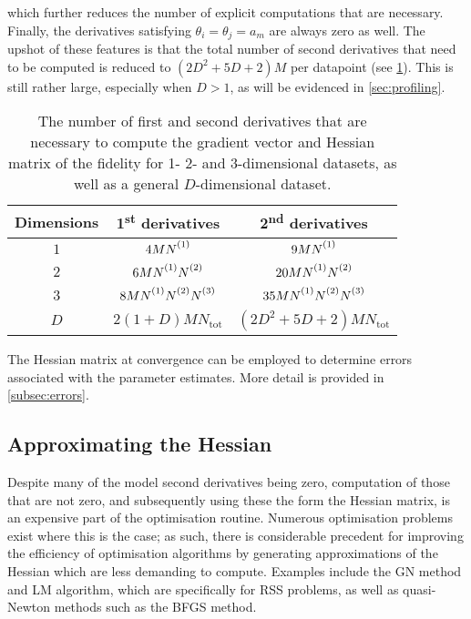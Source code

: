which further reduces the number of explicit computations that are necessary.
Finally, the derivatives satisfying $\theta_i = \theta_j = a_m$ are always
zero as well. The upshot of these features is that the total number of second
derivatives that need to be computed is reduced to $(2D^2 + 5D + 2)M$ per
datapoint (see \cref{tab:number-of-derivatives}). This is still rather large,
especially when $D>1$, as will be evidenced in \cref{sec:profiling}.
\begin{table}
    \begin{center}
        \begin{tabular}{ c c c }
            \toprule
            Dimensions &
                \raisebox{\depth}{\#} 1\textsuperscript{st} derivatives &
                \raisebox{\depth}{\#} 2\textsuperscript{nd} derivatives\\
            \midrule
            $1$ & $4M\None$ & $9M\None$\\
            $2$ & $6M\None\Ntwo$ & $20M\None\Ntwo$\\
            $3$ & $8M\None\Ntwo\Nthree$ & $35M\None\Ntwo\Nthree$\\
            $D$ &  $2(1 + D)M N_{\text{tot}}$ &  $(2D^2 + 5D + 2) M N_{\text{tot}}$\\
            \bottomrule
        \end{tabular}
    \end{center}
    \caption{
        The number of first and second derivatives that are necessary to
        compute the gradient vector and Hessian matrix of the fidelity for
        1- 2- and 3-dimensional datasets, as well as a general $D$-dimensional
        dataset.
    }
    \label{tab:number-of-derivatives}
\end{table}

The Hessian matrix at convergence can be employed to determine errors
associated with the parameter estimates. More detail is provided in
\cref{subsec:errors}.

\subsection{Approximating the Hessian}
\label{subsec:hess-approx}
Despite many of the model second derivatives being zero, computation of those
that are not zero, and subsequently using these the form the Hessian matrix,
is an expensive part of the optimisation routine.
Numerous optimisation problems exist where this is the case; as such,
there is considerable precedent for improving the efficiency of optimisation
algorithms by generating approximations of the Hessian which are less demanding
to compute.
Examples include the \ac{GN} method and \ac{LM} algorithm,
which are specifically for \ac{RSS} problems\cite[Chapter
10]{Nocedal2006}, as well as quasi-Newton methods such as the \ac{BFGS}
method\cite[Chapter 6]{Nocedal2006}.

